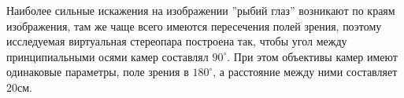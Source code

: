 Наиболее сильные искажения на изображении ''рыбий глаз'' возникают по краям изображения, там же чаще всего имеются пересечения полей зрения,
 поэтому исследуемая виртуальная стереопара построена так, чтобы угол между принципиальными осями камер составлял $90^\circ$. При этом объективы 
 камер имеют одинаковые параметры, поле зрения в $180^\circ$, а расстояние между ними составляет 20см. %

